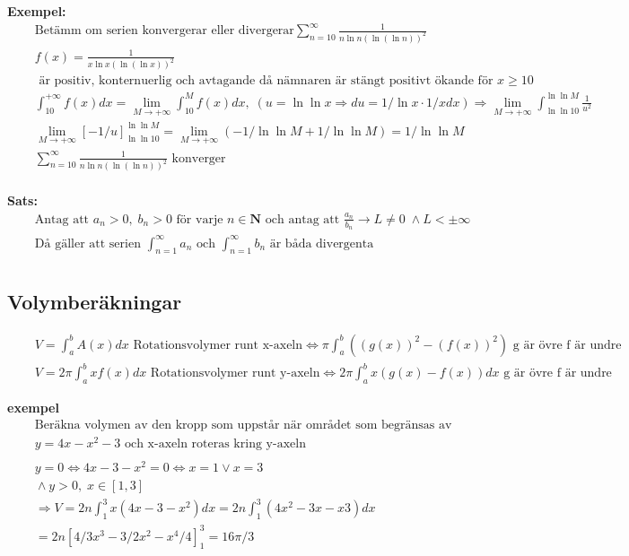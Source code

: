 \textbf{Exempel: }
\begin{align*}
  &\quad  \text{Betämm om serien konvergerar eller divergerar}
  \displaystyle\sum_{n=10}^{\infty} \frac{1}{n\ln{n}{(\ln{(\ln{n})})}^2}  \\
  &\quad  f(x) = \frac{1}{x\ln{x}{(\ln{(\ln{x})})}^2} \\
  &\quad \text{ är positiv, konternuerlig och avtagande då nämnaren är stängt positivt ökande för }
  x \geq 10 \\
  &\quad  \int_{10}^{+\infty} f(x)dx = \lim_{M\to\mathbb{+\infty}} \int_{10}^{M} f(x)dx, \;
  (u=\ln{\ln{x}} \Rightarrow du = 1/\ln{x} \cdot 1/x dx) \Rightarrow
  \lim_{M\to+\infty} \int_{\ln{\ln{10}}}^{\ln{\ln{M}}} \frac{1}{u^2} \\
  &\quad  \lim_{M\to+\infty} {[-1/u]}_{\ln{\ln{10}}}^{\ln{\ln{M}}} =
  \lim_{M\to+\infty} (-1/\ln{\ln{M}}+1/\ln{\ln{M}}) = 1/\ln{\ln{M}} \\
  &\quad  \displaystyle\sum_{n=10}^{\infty} \frac{1}{n\ln{n}{(\ln{(\ln{n})})}^2} \text{ konverger} \\
\end{align*}

\textbf{Sats: }
\begin{align*}
  &\quad  \text{Antag att } a_n >0, \; b_n >0 \text{ för varje } n \in \mathbf{N} \text{ och antag att } 
  \frac{a_n}{b_n}\to L \neq 0 \; \land L < \pm\infty\\
  &\quad  \text{Då gäller att serien } \int_{n=1}^{\infty}a_n \text{ och }
  \int_{n=1}^{\infty}b_n \text{ är båda divergenta} \\
\end{align*}



\newpage


\subsection{Volymberäkningar}
\begin{align*}
  &\quad  V = \int_a^b A(x)dx \text{ Rotationsvolymer runt x-axeln}
  \Leftrightarrow \pi \int_a^b ({(g(x))}^2 - {(f(x))}^2) \text{ g är övre f är undre} \\
  &\quad  V = 2\pi \int_a^b xf(x)dx \text{ Rotationsvolymer runt y-axeln}
  \Leftrightarrow 2\pi \int_a^b x(g(x)-f(x))dx \text{ g är övre f är undre}
\end{align*}

\textbf{exempel}
\begin{align*}
  &\quad  \text{Beräkna volymen av den kropp som uppstår när området som begränsas av kurnvan }  \\
  &\quad  y=4x-x^2-3 \text{ och x-axeln roteras kring y-axeln} \\
  &\quad  \\
  &\quad  y=0 \Leftrightarrow 4x-3-x^2=0 \Leftrightarrow x=1 \lor x=3 \\
  &\quad  \land y>0, \; x\in[1,3] \\
  &\quad  \Rightarrow V = 2n\int_1^3 x(4x-3-x^2)dx = 2n \int_1^3(4x^2-3x-x3)dx \\
  &\quad  = 2n[4/3x^3-3/2x^2-x^4/4]_1^3 = 16\pi/3
\end{align*}


